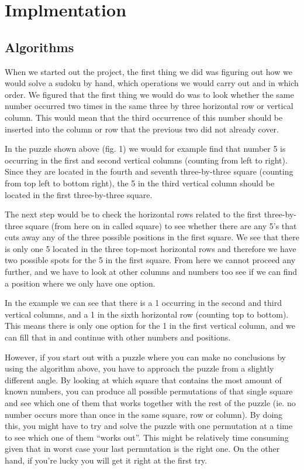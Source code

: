 \documentclass[12pt, a4paper]{article}
\begin{document}
  	\section{Implmentation}
	\begin{adjustwidth}{2em}{0pt}
		\subsection{Algorithms}
			\begin{adjustwidth}{3em}{0pt}
				When we started out the project, the first thing we did was figuring out how we would solve a sudoku by hand, which operations we would carry out and in which order. We figured that the first thing we would do was to look whether the same number occurred two times in the same three by three horizontal row or vertical column. This would mean that the third occurrence of this number should be inserted into the column or row that the previous two did not already cover.

				In the puzzle shown above (fig. 1) we would for example find that number 5 is occurring in the first and second vertical columns (counting from left to right). Since they are located in the fourth and seventh three-by-three square (counting from top left to bottom right), the 5 in the third vertical column should be located in the first three-by-three square.

				The next step would be to check the horizontal rows related to the first three-by-three   square (from here on in called square) to see whether there are any 5’s that cuts away any of the three possible positions in the first square. We see that there is only one 5 located in the three top-most horizontal rows and therefore we have two possible spots for the 5 in the first square. From here we cannot proceed any further, and we have to look at other columns and numbers too see if we can find a position where we only have one option. 

				In the example we can see that there is a 1 occurring in the second and third vertical columns, and a 1 in the sixth horizontal row (counting top to bottom). This means there is only one option for the 1 in the first vertical column, and we can fill that in and continue with other numbers and positions.

				However, if you start out with a puzzle where you can make no conclusions by using the algorithm above, you have to approach the puzzle from a slightly different angle. By looking at which square that contains the most amount of known numbers, you can produce all possible permutations of that single square and see which one of them that works together with the rest of the puzzle (ie. no number occurs more than once in the same square, row or column). By doing this, you might have to try and solve the puzzle with one permutation at a time to see which one of them “works out”. This might be relatively time consuming given that in worst case your last permutation is the right one. On the other hand, if you’re lucky you will get it right at the first try.


\end{adjustwidth}
\end{adjustwidth}
\end{document}
